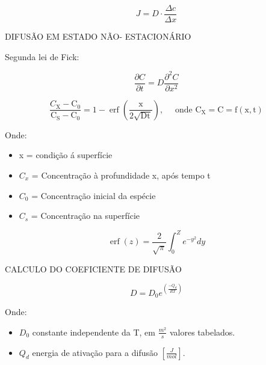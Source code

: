 \begin{equation}\label{key}
J = D \cdot \frac{\Delta c}{\Delta x}
\end{equation}

DIFUSÃO EM ESTADO NÃO- ESTACIONÁRIO

Segunda lei de Fick:

\begin{equation}\label{key}
\frac{\partial C}{\partial t}=D \frac{\partial^{2} C}{\partial x^{2}}
\end{equation}

\begin{equation}\label{key}
\frac{C_{\mathrm{X}}-\mathrm{C}_{0}}{\mathrm{C}_{\mathrm{S}}-\mathrm{C}_{0}}=1-\operatorname{erf}\left(\frac{\mathrm{x}}{2 \sqrt{\mathrm{D} \mathrm{t}}}\right), \quad \text { onde } \mathrm{C}_{\mathrm{X}}=\mathrm{C}=\mathrm{f}(\mathrm{x}, \mathrm{t})
\end{equation}

Onde:

\begin{itemize}
	\item x = condição á superfície
	\item $C_{x}$ = Concentração à profundidade x, após tempo t
	\item $C_{0}$ = Concentração inicial da espécie
	\item $C_{s}$ = Concentração na superfície
\end{itemize}


\begin{equation}\label{key}
\operatorname{erf}(z)=\frac{2}{\sqrt{\pi}} \int_{0}^{Z} e^{-y^{2}} d y
\end{equation}


CALCULO DO COEFICIENTE DE DIFUSÃO

\begin{equation}\label{key}
D=D_{0} e^{\left( \frac{-Q_{d}}{R T}  \right)}
\end{equation}

Onde:


\begin{itemize}
	\item $D_{0}$ constante independente da T, em $\frac{m^{2}}{s}$ valores tabelados.
	\item $Q_{d}$ energia de ativação para a difusão $[\frac{J}{mol}]$.
\end{itemize}



